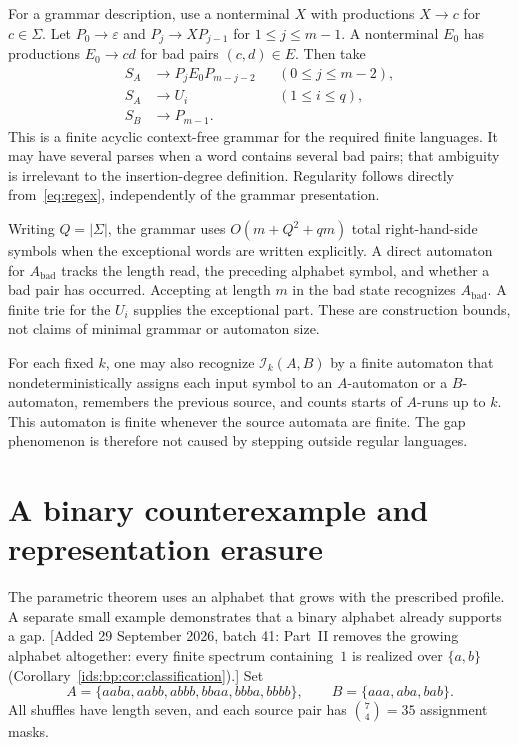 \documentclass[11pt,letterpaper]{article}
\theoremstyle{definition}\newtheorem{definition}[theorem]{Definition}
\theoremstyle{remark}\newtheorem{remark}[theorem]{Remark}
\theoremstyle{definition}\newtheorem{question}[theorem]{Question}
\newcommand{\eps}{\varepsilon}
\newcommand{\ins}[3]{\mathcal I_{#1}(#2,#3)}
\begin{document}
For a grammar description, use a nonterminal $X$ with productions $X\to c$ for $c\in\Sigma$. Let $P_0\to\eps$ and $P_j\to XP_{j-1}$ for $1\leq j\leq m-1$. A nonterminal $E_0$ has productions $E_0\to cd$ for bad pairs $(c,d)\in E$. Then take
\begin{align*}
 S_A&\to P_jE_0P_{m-j-2} &&(0\leq j\leq m-2),\\
 S_A&\to U_i &&(1\leq i\leq q),\\
 S_B&\to P_{m-1}.&
\end{align*}
This is a finite acyclic context-free grammar for the required finite languages. It may have several parses when a word contains several bad pairs; that ambiguity is irrelevant to the insertion-degree definition. Regularity follows directly from~\eqref{eq:regex}, independently of the grammar presentation.

Writing $Q=|\Sigma|$, the grammar uses $O(m+Q^2+qm)$ total right-hand-side symbols when the exceptional words are written explicitly. A direct automaton for $A_{\mathrm{bad}}$ tracks the length read, the preceding alphabet symbol, and whether a bad pair has occurred. Accepting at length $m$ in the bad state recognizes $A_{\mathrm{bad}}$. A finite trie for the $U_i$ supplies the exceptional part. These are construction bounds, not claims of minimal grammar or automaton size.

For each fixed $k$, one may also recognize $\ins{k}{A}{B}$ by a finite automaton that nondeterministically assigns each input symbol to an $A$-automaton or a $B$-automaton, remembers the previous source, and counts starts of $A$-runs up to $k$. This automaton is finite whenever the source automata are finite. The gap phenomenon is therefore not caused by stepping outside regular languages.

\section{A binary counterexample and representation erasure}\label{sec:binary}

The parametric theorem uses an alphabet that grows with the prescribed profile. A separate small example demonstrates that a binary alphabet already supports a gap.
[Added 29 September 2026, batch 41: Part~II removes the growing alphabet altogether: every finite spectrum containing~$1$ is realized over $\{a,b\}$ (Corollary~\ref{ids:bp:cor:classification}).]
Set
\begin{equation}
 A=\{aaba,aabb,abbb,bbaa,bbba,bbbb\},
 \qquad B=\{aaa,aba,bab\}.
 \label{eq:binary}
\end{equation}
All shuffles have length seven, and each source pair has $\binom74=35$ assignment masks.
\end{document}
